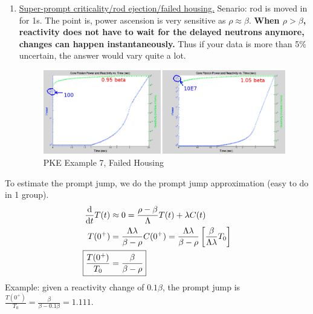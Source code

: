 \documentclass{school-22.211-notes}
\begin{document}
\begin{enumerate}
\item \uline{Super-prompt criticality/rod ejection/failed housing.} Senario: rod is moved in for 1s. The point is, power ascension is very sensitive as $\rho \approx \beta$. \textbf{When $\rho > \beta$, reactivity does not have to wait for the delayed neutrons anymore, changes can happen instantaneously.} Thus if your data is more than 5\% uncertain, the answer would vary quite a lot. 
  \begin{figure}[ht]
    \centering
    \includegraphics[width=6in]{images/pke/ex7.png}
    \caption{PKE Example 7, Failed Housing} 
  \end{figure}
  
\end{enumerate}



\clearpage
{}
To estimate the prompt jump, we do the prompt jump approximation (easy to do in 1 group). 
\begin{align}
\ddt T(t) &\approx 0 = \frac{\rho - \beta}{\Lambda} T(t) + \lambda C(t) \\
T(0^+) &= \frac{\Lambda \lambda}{\beta - \rho} C(0^+) = \frac{\Lambda \lambda}{\beta - \rho} \left[ \frac{\beta}{\Lambda \lambda} T_0 \right] \\
\Aboxed{ \frac{T(0^+)}{T_0} &= \frac{\beta}{\beta - \rho} }
\end{align}
Example: given a reactivity change of $0.1\beta$, the prompt jump is $\frac{T(0^+)}{T_0} = \frac{\beta}{\beta - 0.1 \beta} = 1.111$. 
\end{document}
